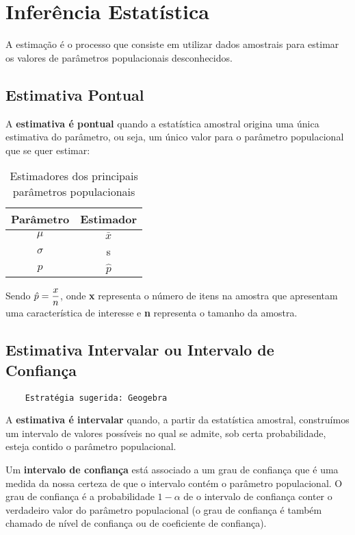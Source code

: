 \chapter{Inferência Estatística}

A estimação é o processo que consiste em utilizar dados amostrais para estimar os valores de parâmetros populacionais desconhecidos. 

\section{Estimativa Pontual}

A \textbf{estimativa é pontual} quando a estatística amostral origina uma única estimativa do parâmetro, ou seja, um único valor para o parâmetro populacional que se quer estimar:

\begin{table}[h]
	\centering	
	\caption{Estimadores dos principais parâmetros populacionais}
	\label{tab:estimadores}
	\begin{tabular}{c|c} 
		Parâmetro	& Estimador	\\
		\hline
		\(\mu\)	& \( \bar{x} \)	\\			
		\(\sigma\) & s		\\
		\( p \)	& \( \hat{p} \)		
	\end{tabular}
\end{table}

Sendo \(\beq{ \hat{p} = \frac{x}{n} }\), onde \textbf{x} representa o número de itens na amostra que apresentam uma característica de interesse e \textbf{n} representa o tamanho da amostra.


\section{Estimativa Intervalar ou Intervalo de Confiança}

\begin{verbatim}
	Estratégia sugerida: Geogebra
\end{verbatim}

A \textbf{estimativa é intervalar} quando, a partir da estatística amostral, construímos um intervalo de valores possíveis no qual se admite, sob certa probabilidade, esteja contido o parâmetro populacional.

Um \textbf{intervalo de confiança} está associado a um grau de confiança que é uma
medida da nossa certeza de que o intervalo contém o parâmetro populacional. O grau de confiança é a probabilidade \(1 - \alpha\) de o intervalo de confiança conter o verdadeiro valor do parâmetro populacional (o grau de confiança é também chamado de nível de confiança ou de coeficiente de confiança).

